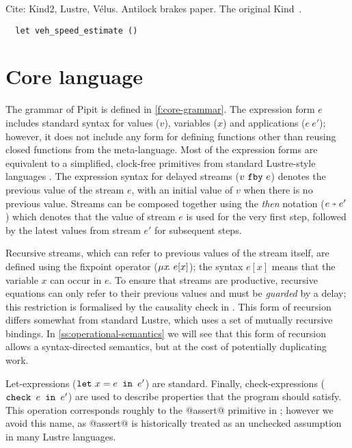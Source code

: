 \documentclass[sigplan,screen]{acmart}
\begin{document}
Cite: Kind2, Lustre, Vélus.
Antilock brakes paper.
The original Kind~\cite{hagen2008verifying}.

\begin{verbatim}
  let veh_speed_estimate ()
\end{verbatim}

\section{Core language}
\label{s:core}





The grammar of Pipit is defined in \autoref{f:core-grammar}.
The expression form $e$ includes standard syntax for values ($v$), variables ($x$) and applications ($e~e'$); however, it does not include any form for defining functions other than reusing closed functions from the \fstar{} meta-language.
Most of the expression forms are equivalent to a simplified, clock-free primitives from standard Lustre-style languages \CITE.
The expression syntax for delayed streams ($v~\texttt{fby}~e$) denotes the previous value of the stream $e$, with an initial value of $v$ when there is no previous value.
Streams can be composed together using the \emph{then} notation ($\xthen{e}{e'}$) which denotes that the value of stream $e$ is used for the very first step, followed by the latest values from stream $e'$ for subsequent steps.

Recursive streams, which can refer to previous values of the stream itself, are defined using the fixpoint operator ($\mu{} x \!.~e[x]$); the syntax $e[x]$ means that the variable $x$ can occur in $e$.
To ensure that streams are productive, recursive equations can only refer to their previous values and must be \emph{guarded} by a delay; this restriction is formalised by the causality check in \REF{}.
This form of recursion differs somewhat from standard Lustre, which uses a set of mutually recursive bindings.
In \autoref{ss:operational-semantics} we will see that this form of recursion allows a syntax-directed semantics, but at the cost of potentially duplicating work.

Let-expressions ($\texttt{let}~x = e \texttt{~in~} e'$) are standard.
Finally, check-expressions ($\texttt{check~} e \texttt{~in~} e'$) are used to describe properties that the program should satisfy.
This operation corresponds roughly to the @assert@ primitive in \fstar{}; however we avoid this name, as @assert@ is historically treated as an unchecked assumption in many Lustre languages.
\end{document}
